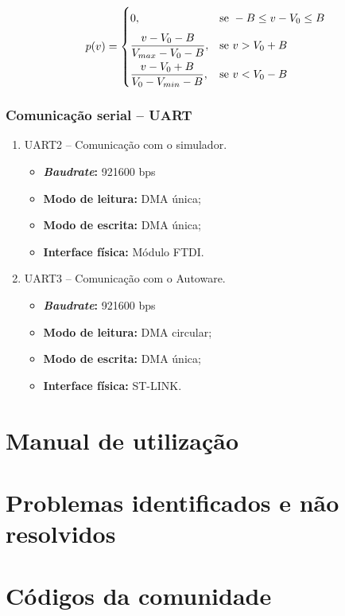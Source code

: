 \begin{equation}\label{eq:joy}
	p(v) = \begin{dcases}
		0\vphantom{\frac{0}{0}}, &\text{se } - B \le v - V_0 \le B \\
		\frac{v - V_0 - B}{V_{max} - V_0 - B}, &\text{se } v > V_0 + B \\
		\frac{v - V_0 + B}{V_0 - V_{min} - B}, &\text{se } v < V_0 - B 
	\end{dcases}
\end{equation}

\subsubsection*{Comunicação serial -- UART}

	\begin{enumerate}
		\item UART2 -- Comunicação com o simulador.
		\begin{itemize}
			\item \textbf{\textit{Baudrate}:} 921600 bps
			\item \textbf{Modo de leitura:} DMA única;
			\item \textbf{Modo de escrita:} DMA única;
			\item \textbf{Interface física:} Módulo FTDI.	
		\end{itemize}
	
		\item UART3 -- Comunicação com o Autoware.
		\begin{itemize}
			\item \textbf{\textit{Baudrate}:} 921600 bps
			\item \textbf{Modo de leitura:} DMA circular;
			\item \textbf{Modo de escrita:} DMA única;
			\item \textbf{Interface física:} ST-LINK.		
		\end{itemize}	
	
	\end{enumerate}

\clearpage

\section{Manual de utilização}



\clearpage


\section{Problemas identificados e não resolvidos}



\clearpage


\section{Códigos da comunidade}